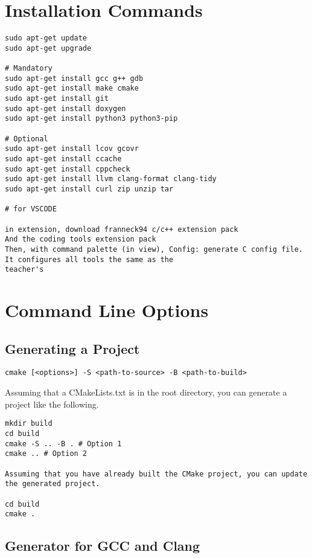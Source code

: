 \section{Installation Commands}

\begin{verbatim}
sudo apt-get update
sudo apt-get upgrade

# Mandatory
sudo apt-get install gcc g++ gdb
sudo apt-get install make cmake
sudo apt-get install git
sudo apt-get install doxygen
sudo apt-get install python3 python3-pip

# Optional
sudo apt-get install lcov gcovr
sudo apt-get install ccache
sudo apt-get install cppcheck
sudo apt-get install llvm clang-format clang-tidy
sudo apt-get install curl zip unzip tar

# for VSCODE

in extension, download franneck94 c/c++ extension pack
And the coding tools extension pack
Then, with command palette (in view), Config: generate C config file. It configures all tools the same as the
teacher's
\end{verbatim}

\section{Command Line Options}

\subsection{Generating a Project}

\begin{verbatim}
cmake [<options>] -S <path-to-source> -B <path-to-build>
\end{verbatim}

Assuming that a CMakeLists.txt is in the root directory, you can generate a project like the following.

\begin{verbatim}
mkdir build
cd build
cmake -S .. -B . # Option 1
cmake .. # Option 2

Assuming that you have already built the CMake project, you can update the generated project.

cd build
cmake .
\end{verbatim}

\subsection{Generator for GCC and Clang}


